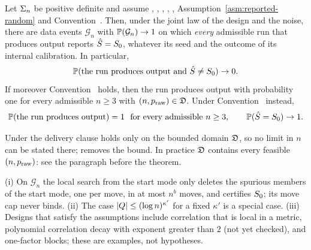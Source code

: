 \begin{theorem}\label{thm:reported-random}
Let $\Sig$ be positive definite and assume , , , , , Assumption~\ref{asm:reported-random}
and Convention~. Then, under the joint law of the design and the noise, there are data events $\mathcal G_n$ with
$\P(\mathcal G_n)\to1$ on which \emph{every} admissible run that produces output reports $\Shat=\Sz$, whatever its seed and the
outcome of its internal calibration. In particular,
\begin{equation}\label{eq:reported}
  \P(\text{the run produces output and }\Shat\neq\Sz)\to0 .
\end{equation}
If moreover Convention~ holds, then the run produces output with probability one for every admissible $n\ge3$
with $(n,\praw)\in\Dom$. Under Convention~ instead,
\begin{equation}\label{eq:delivery}
  \P(\text{the run produces output})=1\ \ \text{for every admissible }n\ge3,\qquad \P(\Shat=\Sz)\to1 .
\end{equation}
\end{theorem}

Under  the delivery clause holds only on the bounded domain $\Dom$, so no limit in $n$ can be stated there;
 removes the bound. In practice $\Dom$ contains every feasible $(n,\praw)$: see the paragraph before the
theorem.


\begin{remark}\label{rem:reported-random-cons}
(i) On $\mathcal G_n$ the local search from the start mode only deletes the spurious members of the start mode, one per
move, in at most $n^b$ moves, and certifies $\Sz$; its move cap never binds.
(ii) The case $\abs{Q}\le(\log n)^{\kappa'}$ for a fixed $\kappa'$ is a special case.
(iii) Designs that satisfy the assumptions include correlation that is local in a metric, polynomial correlation decay
with exponent greater than $2$ (not yet checked), and one-factor blocks; these are examples, not hypotheses.
\end{remark}

